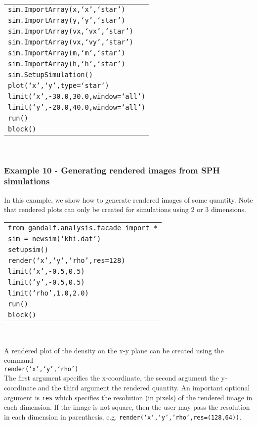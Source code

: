 \documentclass[a4paper]{article}
\newcommand{\var}[1]{\texttt{#1}}
\newcommand{\singlecommand}[1]{\\ \newline \indent \var{#1} \\ \newline \noindent}
\begin{document}
\begin{tabular}{p{14.0cm}}
\var{sim.ImportArray(x,`x',`star')} \\
\var{sim.ImportArray(y,`y',`star')} \\
\var{sim.ImportArray(vx,`vx',`star')} \\
\var{sim.ImportArray(vx,`vy',`star')} \\
\var{sim.ImportArray(m,`m',`star')}   \\
\var{sim.ImportArray(h,`h',`star')}   \\
\var{sim.SetupSimulation()}  \\
\var{plot(`x',`y',type=`star')} \\
\var{limit(`x',-30.0,30.0,window=`all')} \\
\var{limit(`y',-20.0,40.0,window=`all')} \\
\var{run()} \\
\var{block()} \\
\end{tabular} \\
\newline


\subsubsection{Example  10 - Generating rendered images from SPH simulations}
In this example, we show how to generate rendered images of some quantity.  Note that rendered plots can only be created for simulations using 2 or 3 dimensions. \\

\begin{tabular}{p{14.0cm}}
\var{from gandalf.analysis.facade import *} \\
\var{sim = newsim(`khi.dat')} \\
\var{setupsim()} \\
\var{render(`x',`y','rho',res=128)} \\
\var{limit(`x',-0.5,0.5)} \\
\var{limit(`y',-0.5,0.5)} \\
\var{limit(`rho',1.0,2.0)} \\
\var{run()} \\
\var{block()} \\
\end{tabular} \\
\newline

\noindent A rendered plot of the density on the x-y plane can be created using the command \singlecommand{render(`x',`y',`rho')}  The first argument specifies the x-coordinate, the second argument the y-coordinate and the third argument the rendered quantity.  An important optional argument is \var{res} which specifies the resolution (in pixels) of the rendered image in each dimension.  If the image is not square, then the user may pass the resolution in each dimension in parenthesis, e.g. \var{render(`x',`y','rho',res=(128,64))}.
\end{document}
